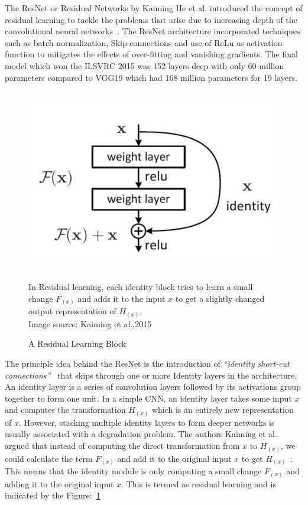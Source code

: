 The ResNet or Residual Networks by Kaiming He et al. introduced the concept of residual learning to tackle the problems that arise due to increasing depth of the convolutional neural networks~\cite{ResNet}. The ResNet architecture incorporated techniques such as batch normalization, Skip-connections and use of ReLu as activation function to mitigates the effects of over-fitting and vanishing gradients. The final model which won the ILSVRC 2015 was 152 layers deep with only 60 million parameters compared to VGG19 which had 168 million parameters for 19 layers.

\begin{figure}[t]
\centering
\includegraphics[width=12cm, height=8cm]{Figures/Residual}
\caption{A Residual Learning Block}
\label{ResLearn}
In Residual learning, each identity block tries to learn a small change $F_{(x)}$ and adds it to the input $x$ to get a slightly changed output representation of $H_{(x)}$. \\Image source: Kaiming et al.,2015~\cite{ResNet}
\end{figure}

The principle idea behind the ResNet is the introduction of \textit{``identity short-cut connections''}~\cite{ResNet} that skips through one or more Identity layers in the architecture. An identity layer is a series of convolution layers followed by its activations group together to form one unit. In a simple CNN, an identity layer takes some input $x$ and computes the transformation $H_{(x)}$ which is an entirely new representation of $x$. However, stacking multiple identity layers to form deeper networks is usually associated with a degradation problem. The authors Kaiming et al. argued that instead of computing the direct transformation from $x$ to $H_{(x)}$, we could calculate the term $F_{(x)}$ and add it to the original input $x$ to get $H_{(x)}$~\cite{ResNet}. This means that the identity module is only computing a small change $F_{(x)}$ and adding it to the original input $x$. This is termed as residual learning and is indicated by the Figure:~\ref{ResLearn}

